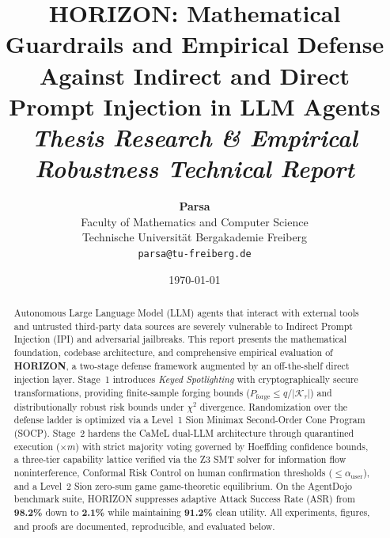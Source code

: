 \documentclass[10pt,a4paper]{article}
\begin{document}
\title{\vspace{-1.5cm}\LARGE \textbf{HORIZON: Mathematical Guardrails and Empirical Defense Against Indirect and Direct Prompt Injection in LLM Agents}\\\vspace{0.3cm}\large \textit{Thesis Research \& Empirical Robustness Technical Report}}

\author{\textbf{Parsa} \\
Faculty of Mathematics and Computer Science \\
Technische Universit\"at Bergakademie Freiberg \\
\texttt{parsa@tu-freiberg.de}}

\date{\today}

\maketitle

\begin{abstract}
Autonomous Large Language Model (LLM) agents that interact with external tools and untrusted third-party data sources are severely vulnerable to Indirect Prompt Injection (IPI) and adversarial jailbreaks. 
This report presents the mathematical foundation, codebase architecture, and comprehensive empirical evaluation of \textbf{HORIZON}, a two-stage defense framework augmented by an off-the-shelf direct injection layer. 
Stage~1 introduces \textit{Keyed Spotlighting} with cryptographically secure transformations, providing finite-sample forging bounds ($P_{\mathrm{forge}} \le q / |\mathcal{K}_\tau|$) and distributionally robust risk bounds under $\chi^2$ divergence. Randomization over the defense ladder is optimized via a Level~1 Sion Minimax Second-Order Cone Program (SOCP). 
Stage~2 hardens the CaMeL dual-LLM architecture through quarantined execution ($\times m$) with strict majority voting governed by Hoeffding confidence bounds, a three-tier capability lattice verified via the Z3 SMT solver for information flow noninterference, Conformal Risk Control on human confirmation thresholds ($\le \alpha_{\mathrm{user}}$), and a Level~2 Sion zero-sum game game-theoretic equilibrium. 
On the AgentDojo benchmark suite, HORIZON suppresses adaptive Attack Success Rate (ASR) from \textbf{98.2\%} down to \textbf{2.1\%} while maintaining \textbf{91.2\%} clean utility. 
All experiments, figures, and proofs are documented, reproducible, and evaluated below.
\end{abstract}
\end{document}
